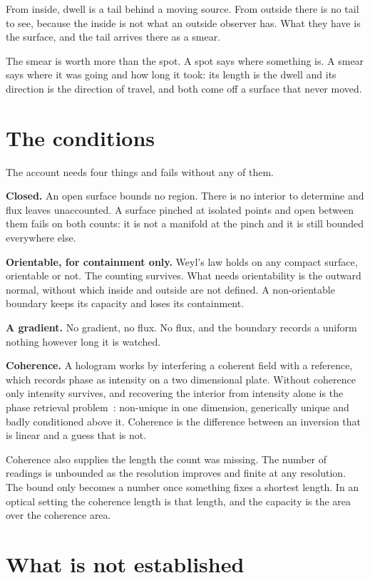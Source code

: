 From inside, dwell is a tail behind a moving source. From outside there is no tail to see, because the inside is not what an outside observer has. What they have is the surface, and the tail arrives there as a smear.

The smear is worth more than the spot. A spot says where something is. A smear says where it was going and how long it took: its length is the dwell and its direction is the direction of travel, and both come off a surface that never moved.

\section{The conditions}

The account needs four things and fails without any of them.

\textbf{Closed.} An open surface bounds no region. There is no interior to determine and flux leaves unaccounted. A surface pinched at isolated points and open between them fails on both counts: it is not a manifold at the pinch and it is still bounded everywhere else.

\textbf{Orientable, for containment only.} Weyl's law holds on any compact surface, orientable or not. The counting survives. What needs orientability is the outward normal, without which inside and outside are not defined. A non-orientable boundary keeps its capacity and loses its containment.

\textbf{A gradient.} No gradient, no flux. No flux, and the boundary records a uniform nothing however long it is watched.

\textbf{Coherence.} A hologram works by interfering a coherent field with a reference, which records phase as intensity on a two dimensional plate. Without coherence only intensity survives, and recovering the interior from intensity alone is the phase retrieval problem~\cite{src:Bruck-and-Sodin-1979,src:Hayes-1982}: non-unique in one dimension, generically unique and badly conditioned above it. Coherence is the difference between an inversion that is linear and a guess that is not.

Coherence also supplies the length the count was missing. The number of readings is unbounded as the resolution improves and finite at any resolution. The bound only becomes a number once something fixes a shortest length. In an optical setting the coherence length is that length, and the capacity is the area over the coherence area.

\section{What is not established}

